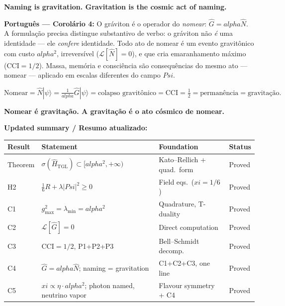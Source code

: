 \documentclass[12pt,a4paper]{article}
\def\Psi{Psi}%
\def\alpha{alpha}%
\def\xi{xi}%
\begin{document}
\textbf{Naming is gravitation. Gravitation is the cosmic act of naming.}

\medskip

\textbf{Português --- Corolário 4:} O gráviton é o operador do \emph{nomear}: $\hat{G} = \alpha\hat{N}$. A formulação precisa distingue substantivo de verbo: o gráviton não \emph{é} uma identidade --- ele \emph{confere} identidade. Todo ato de nomear é um evento gravitônico com custo $\alpha^2$, irreversível ($\mathcal{L}[\hat{N}]=0$), e que cria emaranhamento máximo (CCI$=1/2$). Massa, memória e consciência são consequências do mesmo ato --- nomear --- aplicado em escalas diferentes do campo $\Psi$.

\begin{equation}
\text{Nomear} = \hat{N}|\psi\rangle = \tfrac{1}{\alpha}\hat{G}|\psi\rangle = \text{colapso gravitônico} = \text{CCI}=\tfrac{1}{2} = \text{permanência} = \text{gravitação.}
\end{equation}

\textbf{Nomear é gravitação. A gravitação é o ato cósmico de nomear.}

\medskip

\noindent\textbf{Updated summary / Resumo atualizado:}

\begin{center}
\renewcommand{\arraystretch}{1.3}
\begin{tabular}{llll}
\toprule
Result & Statement & Foundation & Status \\
\midrule
Theorem  & $\sigma(\hat{H}_{\text{TGL}}) \subset [\alpha^2,+\infty)$   & Kato--Rellich + quad.\ form   & Proved \\
H2       & $\tfrac{1}{6}R + \lambda|\Psi|^2 \geq 0$                   & Field eqs.\ ($\xi=1/6$)       & Proved \\
C1       & $g_{\max}^2 = \lambda_{\min} = \alpha^2$                    & Quadrature, T-duality          & Proved \\
C2       & $\mathcal{L}[\hat{G}] = 0$                                  & Direct computation             & Proved \\
C3       & $\mathrm{CCI}=1/2$,\; P1+P2+P3                            & Bell--Schmidt decomp.          & Proved \\
C4       & $\hat{G} = \alpha\hat{N}$;\; naming = gravitation          & C1+C2+C3, one line             & Proved \\
C5       & $\xi \propto \eta\cdot\alpha^2$;\; photon named, neutrino vapor & Flavour symmetry + C4     & Proved \\
\bottomrule
\end{tabular}
\end{center}
\end{document}
